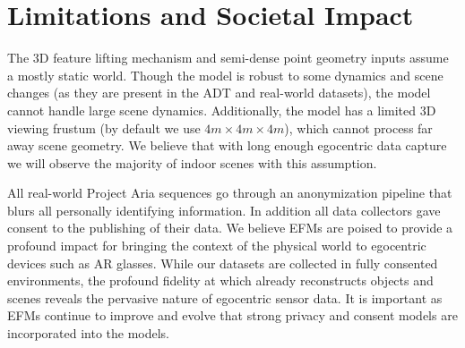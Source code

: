 \section{Limitations and Societal Impact}

The \EFMmodel{} 3D feature lifting mechanism and semi-dense point geometry inputs assume a mostly static world. Though the model is robust to some dynamics and scene changes (as they are present in the ADT and \AOThree{} real-world datasets), the model cannot handle large scene dynamics. Additionally, the \EFMmodel{} model has a limited 3D viewing frustum (by default we use $4m\times 4m\times 4m$), which cannot process far away scene geometry. We believe that with long enough egocentric data capture we will observe the majority of indoor scenes with this assumption.

All real-world Project Aria sequences go through an anonymization pipeline that blurs all personally identifying information. In addition all data collectors gave consent to the publishing of their data. We believe EFMs are poised to provide a profound impact for bringing the context of the physical world to egocentric devices such as AR glasses. While our datasets are collected in fully consented environments, the profound fidelity at which \EFMmodel{} already reconstructs objects and scenes reveals the pervasive nature of egocentric sensor data. It is important as EFMs continue to improve and evolve that strong privacy and consent models are incorporated into the models.

